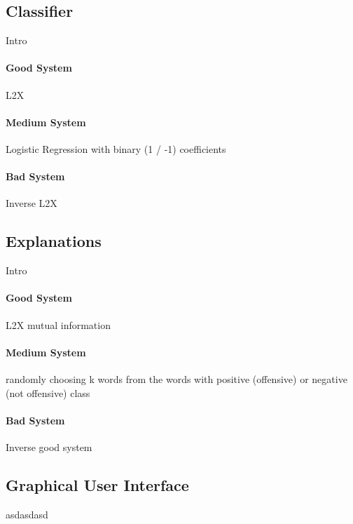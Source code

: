 \subsection{Classifier}
Intro

\paragraph{Good System}
L2X 

\paragraph{Medium System}
Logistic Regression with binary (1 / -1) coefficients

\paragraph{Bad System}
Inverse L2X



\subsection{Explanations}
Intro

\paragraph{Good System}
L2X mutual information

\paragraph{Medium System}
randomly choosing k words from the words with positive (offensive) or negative (not offensive) class

\paragraph{Bad System}
Inverse good system



\subsection{Graphical User Interface}
asdasdasd



